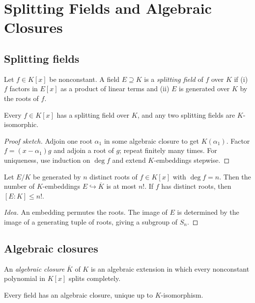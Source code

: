 \section{Splitting Fields and Algebraic Closures}

\subsection{Splitting fields}
\begin{definition}
Let $f\in K[x]$ be nonconstant. A field $E\supseteq K$ is a \emph{splitting field} of $f$ over $K$ if (i) $f$ factors in $E[x]$ as a product of linear terms and (ii) $E$ is generated over $K$ by the roots of $f$.
\end{definition}

\begin{theorem}[Existence]\label{thm:splitting-existence}
Every $f\in K[x]$ has a splitting field over $K$, and any two splitting fields are $K$-isomorphic.
\end{theorem}
\begin{proof}[Proof sketch]
Adjoin one root $\alpha_1$ in some algebraic closure to get $K(\alpha_1)$. Factor $f=(x-\alpha_1)g$ and adjoin a root of $g$; repeat finitely many times.  
For uniqueness, use induction on $\deg f$ and extend $K$-embeddings stepwise.
\end{proof}

\begin{proposition}
Let $E/K$ be generated by $n$ distinct roots of $f\in K[x]$ with $\deg f=n$. Then the number of $K$-embeddings $E\hookrightarrow \overline{K}$ is at most $n!$. If $f$ has distinct roots, then $[E:K]\le n!$.
\end{proposition}
\begin{proof}[Idea]
An embedding permutes the roots. The image of $E$ is determined by the image of a generating tuple of roots, giving a subgroup of $S_n$.
\end{proof}

\subsection{Algebraic closures}
\begin{definition}
An \emph{algebraic closure} $\overline{K}$ of $K$ is an algebraic extension in which every nonconstant polynomial in $K[x]$ splits completely.
\end{definition}
\begin{theorem}
Every field has an algebraic closure, unique up to $K$-isomorphism.
\end{theorem}

